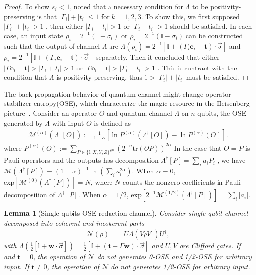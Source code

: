 \documentclass[aps,%
twocolumn,%
floatfix,%
pra,%
amsfonts,%
longbibliography,%
groupedaddress,%
superscriptaddress]{revtex4-2}%
\newtheorem{lemma}{Lemma}
\newcommand{\1}{\mathbbm{1}}
\begin{document}
\begin{proof}
To show $s_i<1$, noted that a necessary condition for $\Lambda$ to be positivity-preserving is that $|\Gamma_i| + |t_i| \leq 1$ for $k = 1, 2, 3$. To show this, we first supposed $|\Gamma_i| + |t_i| > 1$ , then either $|\Gamma_i + t_i|>1$ or $|\Gamma_i - t_i| > 1$ should be satisfied. In each case, an input state $\rho_i = 2^{-1}{(\mathbb{I} + \sigma_i)}$ or $\rho_i = 2^{-1}{(\mathbb{I} - \sigma_i)}$ can be constructed such that the output of channel $\Lambda$ are  $\Lambda(\rho_i) = 2^{-1}{\left[\mathbb{I} + (\Gamma_i \mathbf{e}_i + \mathbf{t}) \cdot \vec \sigma\right]}$ and $\rho_i = 2^{-1}{\left[\mathbb{I} + (\Gamma_i \mathbf{e}_i - \mathbf{t}) \cdot \vec \sigma\right]}$ separately. Then it concluded that either $|\Gamma \mathbf{e}_i + \mathbf{t}| > |\Gamma_i + t_i|>1$ or $|\Gamma \mathbf{e}_i - \mathbf{t}| > |\Gamma_i - t_i|>1$ . This is contract with the condition that $\Lambda$ is positivity-preserving, thus $1 > |\Gamma_i| + |t_i|$ must be satisfied. 
\end{proof}
The back-propagation behavior of quantum channel might change operator stabilizer entropy(OSE), which characterize the magic resource in the Heisenberg picture~\cite{dowling2024magic}. Consider an operator $O$ and quantum channel $\Lambda$ on $n$ qubits, the OSE generated by $\Lambda$ with input $O$ is defined as
\begin{align}
\label{eq:OSE_definition}
    \mathcal{M}^{(\alpha)}({\Lambda}^\dagger[O]) := \frac{1}{1 - \alpha} \left[\ln P^{(\alpha)}(\Lambda^{\dagger}[O]) - \ln P^{(\alpha)}(O)\right].
\end{align}
where $P^{(\alpha)}(O):=\sum_{P \in \{\mathbb{I},X,Y,Z\}^{\otimes n}}\left({2^{-n}}\text{tr}(OP)\right)^{2 \alpha}$
In the case that $O = P$ is Pauli operators and the outputs has decomposition $\Lambda^\dagger[P] = \sum_{i}a_{i} P_i$ , we have $\mathcal{M}(\Lambda^\dagger[P]) = {(1 - \alpha)}^{-1} \ln (\sum_{ i } a_i^{2 \alpha})$. 
When $\alpha = 0$, $\text{exp}\left[\mathcal{M}^{(0)}(\Lambda^\dagger [P])\right] =  N$, where $N$ counts the nonzero coefficients in Pauli decomposition of $\Lambda^\dagger[P]$.  
When $\alpha = 1/2$, $\text{exp}\left[2^{-1}\mathcal{M}^{(1/2)}(\Lambda^\dagger [P])\right] = \sum_i |a_i|$.
\begin{lemma}[Single qubits OSE reduction channel]
    Consider single-qubit channel decomposed into coherent and incoherent parts
\begin{align}
    \mathcal{N}(\rho) &= U \Lambda(V \rho V^\dagger)U^\dagger,
\end{align}
with \(\Lambda\left(\frac{1}{2}[\mathbb{I} + \mathbf{w} \cdot  \vec\sigma]\right) = \frac{1}{2}[\mathbb{I} + (\mathbf{t} + \Gamma\mathbf{w}) \cdot  \vec\sigma]\) and  $U,V$ are Clifford gates.
If and $\mathbf{t} = 0$, the operation of $\mathcal{N}$  do not generates 0-OSE and 1/2-OSE for arbitrary input. 
If $\mathbf{t} \neq 0$, the operation of $\mathcal{N}$ do not generates 1/2-OSE for arbitrary input.
\end{lemma}
\end{document}
